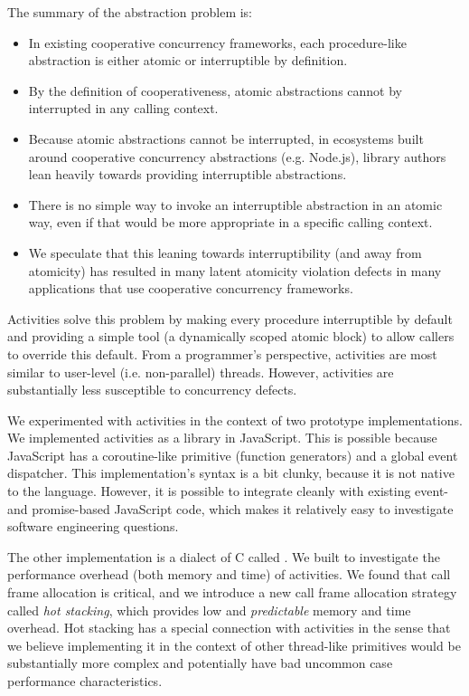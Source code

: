 \documentclass[9pt,preprint]{sigplanconf}
\begin{document}
The summary of the abstraction problem is:

\begin{itemize}
\item In existing cooperative concurrency frameworks, each procedure-like abstraction is either atomic or interruptible by definition.
\item By the definition of cooperativeness, atomic abstractions cannot by interrupted in any calling context.
\item Because atomic abstractions cannot be interrupted, in ecosystems built around cooperative concurrency abstractions (e.g. Node.js), library authors lean heavily towards providing interruptible abstractions.
\item There is no simple way to invoke an interruptible abstraction in an atomic way, even if that would be more appropriate in a specific calling context.
\item We speculate that this leaning towards interruptibility (and away from atomicity) has resulted in many latent atomicity violation defects in many applications that use cooperative concurrency frameworks.
\end{itemize}

Activities solve this problem by making every procedure interruptible by default and providing a simple tool (a dynamically scoped atomic block) to allow callers to override this default.
From a programmer's perspective, activities are most similar to user-level (i.e. non-parallel) threads.
However, activities are substantially less susceptible to concurrency defects.

We experimented with activities in the context of two prototype implementations.
We implemented activities as a library in JavaScript.
This is possible because JavaScript has a coroutine-like primitive (function generators) and a global event dispatcher.
This implementation's syntax is a bit clunky, because it is not native to the language.
However, it is possible to integrate cleanly with existing event- and promise-based JavaScript code, which makes it relatively easy to investigate software engineering questions.

The other implementation is a dialect of C called \charcoal{}.
We built \charcoal{} to investigate the performance overhead (both memory and time) of activities.
We found that call frame allocation is critical, and we introduce a new call frame allocation strategy called \emph{hot stacking}, which provides low and \emph{predictable} memory and time overhead.
Hot stacking has a special connection with activities in the sense that we believe implementing it in the context of other thread-like primitives would be substantially more complex and potentially have bad uncommon case performance characteristics.
\end{document}
